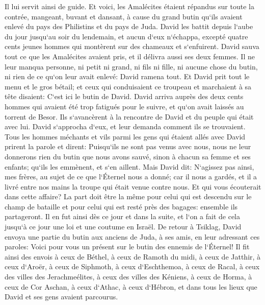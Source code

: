 \verse Il lui servit ainsi de guide. Et voici, les Amalécites étaient répandus sur toute la contrée, mangeant, buvant et dansant, à cause du grand butin qu`ils avaient enlevé du pays des Philistins et du pays de Juda. 
\verse David les battit depuis l`aube du jour jusqu`au soir du lendemain, et aucun d`eux n`échappa, excepté quatre cents jeunes hommes qui montèrent sur des chameaux et s`enfuirent. 
\verse David sauva tout ce que les Amalécites avaient pris, et il délivra aussi ses deux femmes. 
\verse Il ne leur manqua personne, ni petit ni grand, ni fils ni fille, ni aucune chose du butin, ni rien de ce qu`on leur avait enlevé: David ramena tout. 
\verse Et David prit tout le menu et le gros bétail; et ceux qui conduisaient ce troupeau et marchaient à sa tête disaient: C`est ici le butin de David. 
\verse David arriva auprès des deux cents hommes qui avaient été trop fatigués pour le suivre, et qu`on avait laissés au torrent de Besor. Ils s`avancèrent à la rencontre de David et du peuple qui était avec lui. David s`approcha d`eux, et leur demanda comment ils se trouvaient. 
\verse Tous les hommes méchants et vils parmi les gens qui étaient allés avec David prirent la parole et dirent: Puisqu`ils ne sont pas venus avec nous, nous ne leur donnerons rien du butin que nous avons sauvé, sinon à chacun sa femme et ses enfants; qu`ils les emmènent, et s`en aillent. 
\verse Mais David dit: N`agissez pas ainsi, mes frères, au sujet de ce que l`Éternel nous a donné; car il nous a gardés, et il a livré entre nos mains la troupe qui était venue contre nous. 
\verse Et qui vous écouterait dans cette affaire? La part doit être la même pour celui qui est descendu sur le champ de bataille et pour celui qui est resté près des bagages: ensemble ils partageront. 
\verse Il en fut ainsi dès ce jour et dans la suite, et l`on a fait de cela jusqu`à ce jour une loi et une coutume en Israël. 
\verse De retour à Tsiklag, David envoya une partie du butin aux anciens de Juda, à ses amis, en leur adressant ces paroles: Voici pour vous un présent sur le butin des ennemis de l`Éternel! 
\verse Il fit ainsi des envois à ceux de Béthel, à ceux de Ramoth du midi, à ceux de Jatthir, 
\verse à ceux d`Aroër, à ceux de Siphmoth, à ceux d`Eschthemoa, 
\verse à ceux de Racal, à ceux des villes des Jerachmeélites, à ceux des villes des Kéniens, 
\verse à ceux de Horma, à ceux de Cor Aschan, à ceux d`Athac, 
\verse à ceux d`Hébron, et dans tous les lieux que David et ses gens avaient parcourus. 

